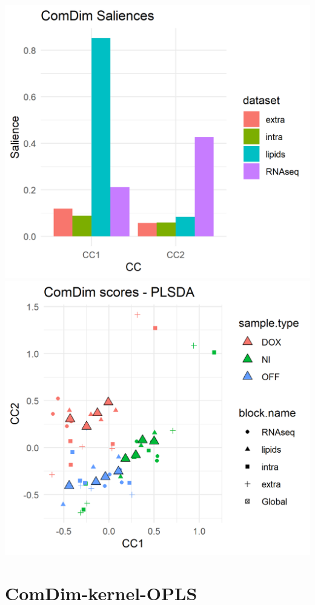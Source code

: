 \documentclass[
]{book}
\begin{document}
\includegraphics{Figs/fig6_1.png}
\includegraphics{Figs/fig6_2.png}

\hypertarget{KOPLS}{%
\section{ComDim-kernel-OPLS}\label{KOPLS}}
\end{document}

